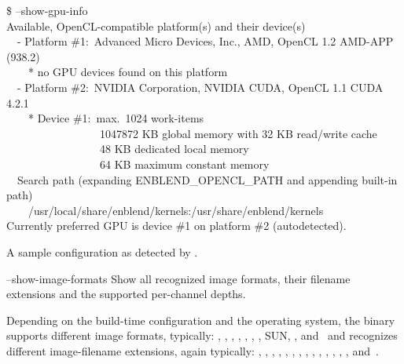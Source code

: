 \begin{codelist}
  \begin{exemplar}[htbp]
    \begin{maxipage}
      \centering
      \begin{terminal}
        \$ \app{} --show-gpu-info \\
        Available, OpenCL-compatible platform(s) and their device(s) \\
        ~~- Platform \#1:~Advanced Micro Devices, Inc., AMD, OpenCL 1.2 AMD-APP (938.2) \\
        ~~~~* no GPU devices found on this platform \\
        ~~- Platform \#2:~NVIDIA Corporation, NVIDIA CUDA, OpenCL 1.1 CUDA 4.2.1 \\
        ~~~~* Device \#1:~max.~1024 work-items \\
        ~~~~~~~~~~~~~~~~~1047872 KB global memory with 32 KB read/write cache \\
        ~~~~~~~~~~~~~~~~~48 KB dedicated local memory \\
        ~~~~~~~~~~~~~~~~~64 KB maximum constant memory \\
        ~~Search path (expanding ENBLEND\_OPENCL\_PATH and appending built-in path) \\
        ~~~~/usr/local/share/enblend/kernels:/usr/share/enblend/kernels \\
        Currently preferred GPU is device \#1 on platform \#2 (autodetected).
      \end{terminal}
    \end{maxipage}

    \caption[Sample  configuration.]{\label{ex:opencl-config}A sample
       configuration as detected by \App.}
  \end{exemplar}


  \label{opt:show-image-formats}%
\item[--show-image-formats]\itemend
  Show all recognized image formats,
  their filename extensions and the supported per-channel depths.

  Depending on the build-time configuration and the operating system, the binary supports
  different image formats, typically: , , ,
  , , , , SUN, ,
  and~ and recognizes different image-filename extensions, again typically:
  , , , , ,
  , , , , ,
  , , , , and~.


\end{codelist}
